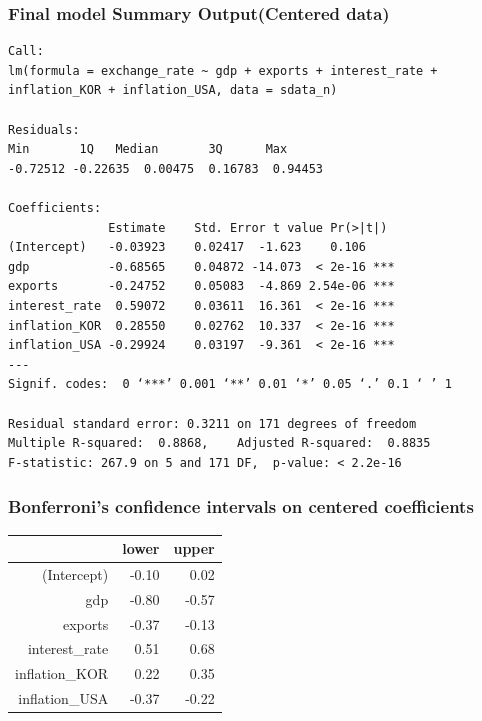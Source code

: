 \documentclass[12pt]{article}
\begin{document}
\subsubsection{Final model Summary Output(Centered data)}
\label{centered}

\begin{verbatim}
Call:
lm(formula = exchange_rate ~ gdp + exports + interest_rate + 
inflation_KOR + inflation_USA, data = sdata_n)

Residuals:
Min       1Q   Median       3Q      Max 
-0.72512 -0.22635  0.00475  0.16783  0.94453 

Coefficients:
              Estimate    Std. Error t value Pr(>|t|)    
(Intercept)   -0.03923    0.02417  -1.623    0.106    
gdp           -0.68565    0.04872 -14.073  < 2e-16 ***
exports       -0.24752    0.05083  -4.869 2.54e-06 ***
interest_rate  0.59072    0.03611  16.361  < 2e-16 ***
inflation_KOR  0.28550    0.02762  10.337  < 2e-16 ***
inflation_USA -0.29924    0.03197  -9.361  < 2e-16 ***
---
Signif. codes:  0 ‘***’ 0.001 ‘**’ 0.01 ‘*’ 0.05 ‘.’ 0.1 ‘ ’ 1

Residual standard error: 0.3211 on 171 degrees of freedom
Multiple R-squared:  0.8868,	Adjusted R-squared:  0.8835 
F-statistic: 267.9 on 5 and 171 DF,  p-value: < 2.2e-16
\end{verbatim}

\subsubsection{Bonferroni's confidence intervals on centered coefficients}

\begin{table}[ht]
\centering
\begin{tabular}{rrr}
  \hline
 & lower & upper \\
  \hline
(Intercept) & -0.10 & 0.02 \\
  gdp & -0.80 & -0.57 \\
  exports & -0.37 & -0.13 \\
  interest\_rate & 0.51 & 0.68 \\
  inflation\_KOR & 0.22 & 0.35 \\
  inflation\_USA & -0.37 & -0.22 \\
   \hline
\end{tabular}
\end{table}
\end{document}
